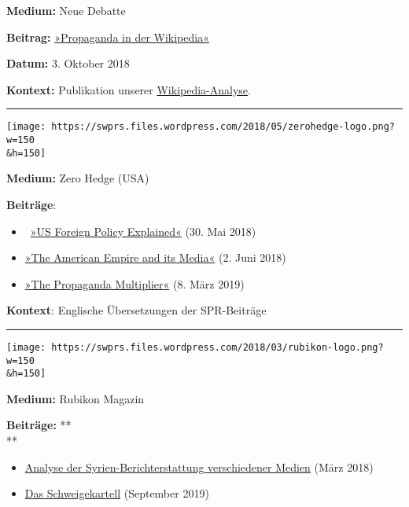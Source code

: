 \textbf{Medium:} Neue Debatte

\textbf{Beitrag:}
\href{https://neue-debatte.com/2018/10/03/propaganda-in-der-wikipedia/}{»Propaganda
in der Wikipedia«}

\textbf{Datum:} 3. Oktober 2018

\textbf{Kontext:} Publikation unserer
\href{https://swprs.org/propaganda-in-der-wikipedia/}{Wikipedia-Analyse}.

\begin{center}\rule{0.5\linewidth}{\linethickness}\end{center}

\texttt{[image: https://swprs.files.wordpress.com/2018/05/zerohedge-logo.png?w=150\\\&h=150]}

\textbf{Medium:} Zero Hedge (USA)

\textbf{Beiträge}:

\begin{itemize}
\tightlist
\item
  ~\href{https://www.zerohedge.com/news/2018-05-29/visualizing-imperial-logic-us-foreign-policy}{»US
  Foreign Policy Explained«} (30. Mai 2018)
\item
  \href{https://www.zerohedge.com/news/2018-06-02/american-empire-its-media}{»The
  American Empire and its Media«} (2. Juni 2018)
\item
  \href{//www.zerohedge.com/news/2019-03-08/propaganda-multiplier-how-western-media-report-geopolitics}{»The
  Propaganda Multiplier«} (8. März 2019)
\end{itemize}

\textbf{Kontext}: Englische Übersetzungen der SPR-Beiträge

\begin{center}\rule{0.5\linewidth}{\linethickness}\end{center}

\texttt{[image: https://swprs.files.wordpress.com/2018/03/rubikon-logo.png?w=150\\\&h=150]}

\textbf{Medium:} Rubikon Magazin

\textbf{Beiträge:} **\\
**

\begin{itemize}
\tightlist
\item
  \href{https://www.rubikon.news/artikel/und-niemand-stoppt-assad}{Analyse
  der Syrien-Berichterstattung verschiedener Medien} (März 2018)
\item
  \href{https://www.rubikon.news/artikel/das-schweigekartell}{Das
  Schweigekartell} (September 2019)
\end{itemize}

